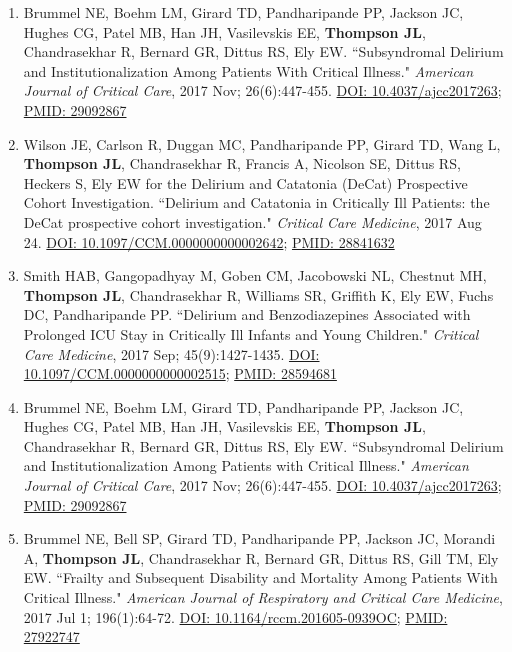 \documentclass[5pt]{article}
\begin{document}
\begin{enumerate}
\item Brummel NE, Boehm LM, Girard TD, Pandharipande PP, Jackson JC, Hughes CG, Patel MB, Han JH, Vasilevskis EE, \textbf{Thompson JL}, Chandrasekhar R, Bernard GR, Dittus RS, Ely EW. ``Subsyndromal Delirium and Institutionalization Among Patients With Critical Illness." \emph{American Journal of Critical Care}, 2017 Nov; 26(6):447-455. \href{https://doi.org/10.4037/ajcc2017263}{DOI: 10.4037/ajcc2017263}; \href{https://www.ncbi.nlm.nih.gov/pubmed/29092867}{PMID: 29092867}
\item Wilson JE, Carlson R, Duggan MC, Pandharipande PP, Girard TD, Wang L, \textbf{Thompson JL}, Chandrasekhar R, Francis A, Nicolson SE, Dittus RS, Heckers S, Ely EW for the Delirium and Catatonia (DeCat) Prospective Cohort Investigation. ``Delirium and Catatonia in Critically Ill Patients: the DeCat prospective cohort investigation." \emph{Critical Care Medicine}, 2017 Aug 24. \href{https://doi.org/10.1097/CCM.0000000000002642}{DOI: 10.1097/CCM.0000000000002642}; \href{https://www.ncbi.nlm.nih.gov/pubmed/28841632}{PMID: 28841632}
\item Smith HAB, Gangopadhyay M, Goben CM, Jacobowski NL, Chestnut MH, \textbf{Thompson JL}, Chandrasekhar R, Williams SR, Griffith K, Ely EW, Fuchs DC, Pandharipande PP. ``Delirium and Benzodiazepines Associated with Prolonged ICU Stay in Critically Ill Infants and Young Children." \emph{Critical Care Medicine}, 2017 Sep; 45(9):1427-1435. \href{https://doi.org/10.1097/CCM.0000000000002515}{DOI: 10.1097/CCM.0000000000002515}; \href{https://www.ncbi.nlm.nih.gov/pubmed/28594681}{PMID: 28594681}
\item Brummel NE, Boehm LM, Girard TD, Pandharipande PP, Jackson JC, Hughes CG, Patel MB, Han JH, Vasilevskis EE, \textbf{Thompson JL}, Chandrasekhar R, Bernard GR, Dittus RS, Ely EW. ``Subsyndromal Delirium and Institutionalization Among Patients with Critical Illness." \emph{American Journal of Critical Care}, 2017 Nov; 26(6):447-455. \href{https://doi.org/10.4037/ajcc2017263}{DOI: 10.4037/ajcc2017263}; \href{https://www.ncbi.nlm.nih.gov/pubmed/29092867}{PMID: 29092867}
\item Brummel NE, Bell SP, Girard TD, Pandharipande PP, Jackson JC, Morandi A, \textbf{Thompson JL}, Chandrasekhar R, Bernard GR, Dittus RS, Gill TM, Ely EW. ``Frailty and Subsequent Disability and Mortality Among Patients With Critical Illness." \emph{American Journal of Respiratory and Critical Care Medicine}, 2017 Jul 1; 196(1):64-72. \href{https://doi.org/10.1164/rccm.201605-0939OC}{DOI: 10.1164/rccm.201605-0939OC}; \href{https://www.ncbi.nlm.nih.gov/pubmed/27922747}{PMID: 27922747}

\end{enumerate}
\end{document}
